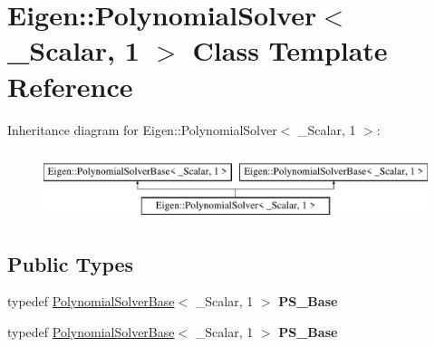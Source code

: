 \hypertarget{class_eigen_1_1_polynomial_solver_3_01___scalar_00_011_01_4}{}\section{Eigen\+:\+:Polynomial\+Solver$<$ \+\_\+\+Scalar, 1 $>$ Class Template Reference}
\label{class_eigen_1_1_polynomial_solver_3_01___scalar_00_011_01_4}
Inheritance diagram for Eigen\+:\+:Polynomial\+Solver$<$ \+\_\+\+Scalar, 1 $>$\+:\begin{figure}[H]
\begin{center}
\leavevmode
\includegraphics[height=2.000000cm]{class_eigen_1_1_polynomial_solver_3_01___scalar_00_011_01_4}
\end{center}
\end{figure}
\subsection*{Public Types}
\begin{DoxyCompactItemize}
\item 
\mbox{\label{class_eigen_1_1_polynomial_solver_3_01___scalar_00_011_01_4_abb4ffe52252af1e75bfdcf69169b9a6b}} 
typedef \hyperlink{class_eigen_1_1_polynomial_solver_base}{Polynomial\+Solver\+Base}$<$ \+\_\+\+Scalar, 1 $>$ {\bfseries P\+S\+\_\+\+Base}
\item 
\mbox{\label{class_eigen_1_1_polynomial_solver_3_01___scalar_00_011_01_4_abb4ffe52252af1e75bfdcf69169b9a6b}} 
typedef \hyperlink{class_eigen_1_1_polynomial_solver_base}{Polynomial\+Solver\+Base}$<$ \+\_\+\+Scalar, 1 $>$ {\bfseries P\+S\+\_\+\+Base}
\end{DoxyCompactItemize}

